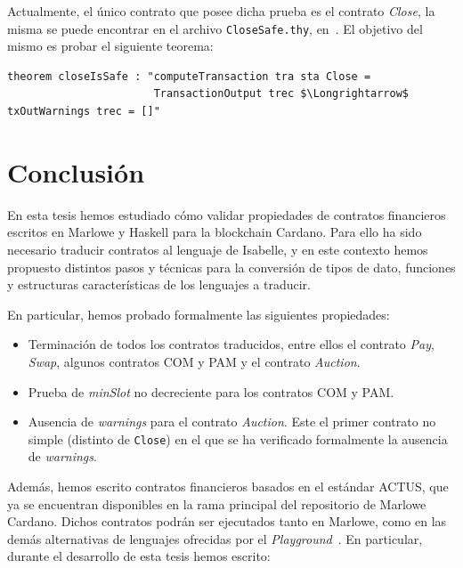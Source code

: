 \documentclass[12pt]{book}
\begin{document}
Actualmente, el único contrato que posee dicha prueba es el contrato \textit{Close}, la misma se puede encontrar en el archivo \texttt{CloseSafe.thy}, en~\cite{marlowe-isabelle-repo}. El objetivo del mismo es probar el siguiente teorema:

\begin{lstlisting}[style=Isabelle, caption=Ausencia de \textit{warnings} para el contrato \texttt{Close} en sintaxis de Isabelle/HOL.]
theorem closeIsSafe : "computeTransaction tra sta Close = 
                       TransactionOutput trec $\Longrightarrow$ txOutWarnings trec = []"
\end{lstlisting}





\chapter{Conclusión}

En esta tesis hemos estudiado cómo validar propiedades de contratos financieros escritos en Marlowe y Haskell para la blockchain Cardano. Para ello ha sido necesario traducir contratos al lenguaje de Isabelle, y en este contexto hemos propuesto distintos pasos y técnicas para la conversión de tipos de dato, funciones y estructuras características de los lenguajes a traducir.


En particular, hemos probado formalmente las siguientes propiedades:

\begin{itemize}
    \item Terminación de todos los contratos traducidos, entre ellos el contrato \textit{Pay}, \textit{Swap}, algunos contratos COM y PAM y el contrato \textit{Auction}.
    \item Prueba de \textit{minSlot} no decreciente para los contratos COM y PAM.\@
    \item Ausencia de \textit{warnings} para el contrato \textit{Auction}. Este el primer contrato no simple (distinto de \texttt{Close}) en el que se ha verificado formalmente la ausencia de \textit{warnings}.
\end{itemize}

Además, hemos escrito contratos financieros basados en el estándar ACTUS, que ya se encuentran disponibles en la rama principal del repositorio de Marlowe Cardano. Dichos contratos podrán ser ejecutados tanto en Marlowe, como en las demás alternativas de lenguajes ofrecidas por el \textit{Playground}~\cite{marlowe_playground}. En particular, durante el desarrollo de esta tesis hemos escrito:
\end{document}
